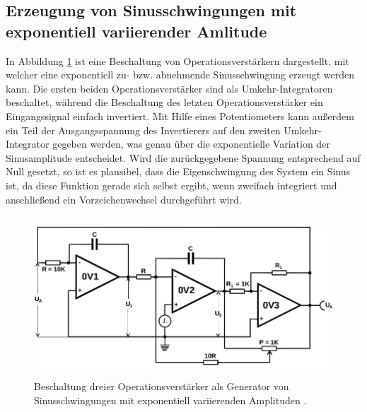 \subsection{Erzeugung von Sinusschwingungen mit exponentiell variierender Amlitude}

In Abbildung \ref{fig:expsin} ist eine Beschaltung von Operationsverstärkern dargestellt, mit welcher
eine exponentiell zu- bzw. abnehmende Sinusschwingung erzeugt werden kann. Die ersten beiden Operationsverstärker
sind als Umkehr-Integratoren beschaltet, während die Beschaltung des letzten Operationsverstärker ein
Eingangssignal einfach invertiert. Mit Hilfe eines Potentiometers kann außerdem ein Teil der Ausgangsspannung
des Invertierers auf den zweiten Umkehr-Integrator gegeben werden, was genau über die exponentielle Variation
der Sinusamplitude entscheidet. Wird die zurückgegebene Spannung entsprechend auf Null gesetzt, so ist es plausibel,
dass die Eigenschwingung des System ein Sinus ist, da diese Funktion gerade sich selbst ergibt, wenn
zweifach integriert und anschließend ein Vorzeichenwechsel durchgeführt wird.

\begin{figure}
  \centering
  \includegraphics[height=6cm]{ImmerDieseNorweger/expsin.png}
  \caption{Beschaltung dreier Operationsverstärker als Generator von Sinusschwingungen mit exponentiell
  variierenden Amplituden \cite{anleitung}.}
  \label{fig:expsin}
\end{figure}

